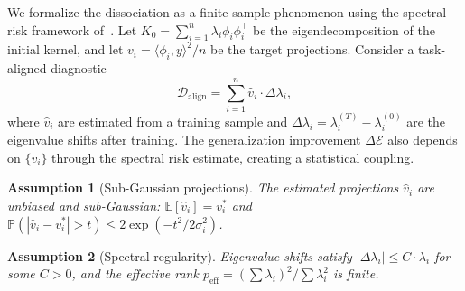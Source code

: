 \documentclass[twoside,11pt]{article}
\newtheorem{assumption}{Assumption}
\begin{document}
We formalize the dissociation as a finite-sample phenomenon using the spectral risk framework of~\citet{canatar2021spectral}.  Let $K_0 = \sum_{i=1}^n \lambda_i \phi_i \phi_i^\top$ be the eigendecomposition of the initial kernel, and let $v_i = \langle \phi_i, y \rangle^2 / n$ be the target projections.  Consider a task-aligned diagnostic
\[
\mathcal{D}_{\text{align}} = \sum_{i=1}^n \hat{v}_i \cdot \Delta\lambda_i,
\]
where $\hat{v}_i$ are estimated from a training sample and $\Delta\lambda_i = \lambda_i^{(T)} - \lambda_i^{(0)}$ are the eigenvalue shifts after training.  The generalization improvement $\Delta\mathcal{E}$ also depends on $\{v_i\}$ through the spectral risk estimate, creating a statistical coupling.

\begin{assumption}[Sub-Gaussian projections]
\label{assum:proj}
The estimated projections $\hat{v}_i$ are unbiased and sub-Gaussian: $\mathbb{E}[\hat{v}_i] = v_i^*$ and $\mathbb{P}(|\hat{v}_i - v_i^*| > t) \leq 2\exp(-t^2 / 2\sigma_i^2)$.
\end{assumption}

\begin{assumption}[Spectral regularity]
\label{assum:spec}
Eigenvalue shifts satisfy $|\Delta\lambda_i| \leq C \cdot \lambda_i$ for some $C > 0$, and the effective rank $p_{\text{eff}} = (\sum \lambda_i)^2 / \sum \lambda_i^2$ is finite.
\end{assumption}
\end{document}
